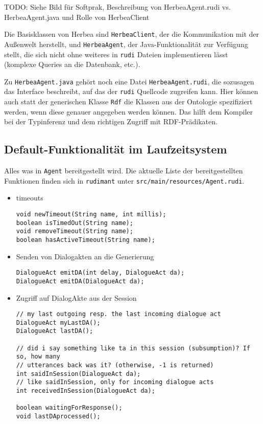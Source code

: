 TODO: Siehe Bild für Softprak, Beschreibung von HerbeaAgent.rudi
vs. HerbeaAgent.java und Rolle von HerbeaClient

Die Basisklassen von Herbea sind \texttt{HerbeaClient}, der die Kommunikation
mit der Außenwelt herstellt, und \texttt{HerbeaAgent}, der Java-Funktionalität
zur Verfügung stellt, die sich nicht ohne weiteres in \texttt{rudi} Dateien
implementieren lässt (komplexe Queries an die Datenbank, etc.).

Zu \texttt{HerbeaAgent.java} gehört noch eine Datei \texttt{HerbeaAgent.rudi},
die sozusagen das Interface beschreibt, auf das der \texttt{rudi} Quellcode
zugreifen kann. Hier können auch statt der generischen Klasse \texttt{Rdf} die
Klassen aus der Ontologie spezifiziert werden, wenn diese genauer angegeben
werden können. Das hilft dem Kompiler bei der Typinferenz und dem richtigen
Zugriff mit RDF-Prädikaten.

\subsection{Default-Funktionalität im Laufzeitsystem}
Alles was in \texttt{Agent} bereitgestellt wird. Die aktuelle Liste der
bereitgestellten Funktionen finden sich in \texttt{rudimant} unter
\texttt{src/main/resources/Agent.rudi}.

\begin{itemize}
\item timeouts
\begin{verbatim}
void newTimeout(String name, int millis);
boolean isTimedOut(String name);
void removeTimeout(String name);
boolean hasActiveTimeout(String name);
\end{verbatim}
\item Senden von Dialogakten an die Generierung
\begin{verbatim}
DialogueAct emitDA(int delay, DialogueAct da);
DialogueAct emitDA(DialogueAct da);
\end{verbatim}
\item Zugriff auf DialogAkte aus der Session
\begin{verbatim}
// my last outgoing resp. the last incoming dialogue act
DialogueAct myLastDA();
DialogueAct lastDA();

// did i say something like ta in this session (subsumption)? If so, how many
// utterances back was it? (otherwise, -1 is returned)
int saidInSession(DialogueAct da);
// like saidInSession, only for incoming dialogue acts
int receivedInSession(DialogueAct da);

boolean waitingForResponse();
void lastDAprocessed();
\end{verbatim}
\end{itemize}

